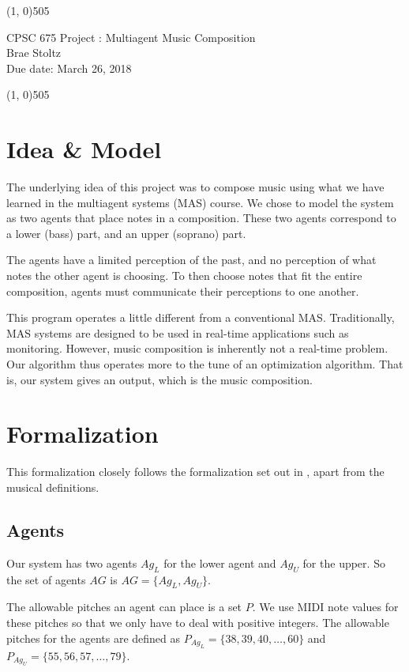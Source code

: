 \documentclass[12pt]{article}
\begin{document}
	\linethickness{.03in}
	\noindent
	\line(1, 0){505} 
	\Large
	\begin{center}
		CPSC 675 Project : Multiagent Music Composition \\
		Brae Stoltz \\
		Due date: March 26, 2018
	\end{center}
	\noindent
	\line(1, 0){505}   \\
	\normalsize
	
	\section{Idea \& Model}
	The underlying idea of this project was to compose music using what we have learned in the multiagent systems (MAS) course. We chose to model the system as two agents that place notes in a composition. These two agents correspond to a lower (bass) part, and an upper (soprano) part.
	
	The agents have a limited perception of the past, and no perception of what notes the other agent is choosing. To then choose notes that fit the entire composition, agents must communicate their perceptions to one another.
	
	This program operates a little different from a conventional MAS. Traditionally, MAS systems are designed to be used in real-time applications such as monitoring. However, music composition is inherently not a real-time problem. Our algorithm thus operates more to the tune of an optimization algorithm. That is, our system gives an output, which is the music composition. 
	
	\section{Formalization}
	This formalization closely follows the formalization set out in \cite{wooldridge2009introduction}, apart from the musical definitions.
	
	\subsection{Agents}
	Our system has two agents $Ag_L$ for the lower agent and $Ag_U$ for the upper. So the set of agents $AG$ is
	$AG = \{Ag_L, Ag_U\}$.
	
	The allowable pitches an agent can place is a set $P$. We use MIDI note values for these pitches so that we only have to deal with positive integers. The allowable pitches for the agents are defined as
	$P_{Ag_L} = \{38, 39, 40, \dots ,60\}$
	and 
	$P_{Ag_U} = \{55, 56, 57, \dots ,79\}$.
	
\end{document}
